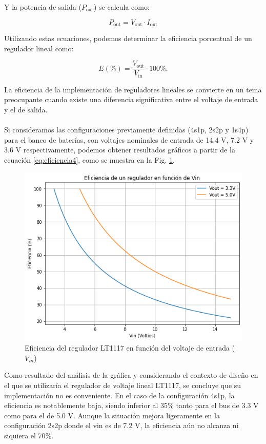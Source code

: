 Y la potencia de salida ($P_{\text{out}}$) se calcula como:

\begin{equation}
P_{\text{out}} = V_{\text{out}} \cdot I_{\text{out}}
\label{eq:eficiencia3}
\end{equation}

Utilizando estas ecuaciones, podemos determinar la eficiencia porcentual de un regulador lineal como:

\begin{equation}
E (\%) = \frac{V_{\text{out}}}{V_{\text{in}}}\cdot 100\%.
\label{eq:eficiencia4}
\end{equation}

La eficiencia de la implementación de reguladores lineales se convierte en un tema preocupante cuando existe una diferencia significativa entre el voltaje de entrada y el de salida. \\\\Si consideramos las configuraciones previamente definidas (4s1p, 2s2p y 1s4p) para el banco de baterías, con voltajes nominales de entrada de 14.4 V, 7.2 V y 3.6 V respectivamente, podemos obtener resultados gráficos a partir de la ecuación \ref{eq:eficiencia4}, como se muestra en la Fig. \ref{fig:LDO_Efficiency}.

\newpage

\begin{figure}[h]
  \centering
  \includegraphics[width=0.8\linewidth]{Pictures/Grafica_Eficiencia_LDO.png} 
  \caption{Eficiencia del regulador LT1117 en función del voltaje de entrada ($V_{in}$)}
  \label{fig:LDO_Efficiency}
\end{figure}

Como resultado del análisis de la gráfica y considerando el contexto de diseño en el que se utilizaría el regulador de voltaje lineal LT1117, se concluye que su implementación no es conveniente. En el caso de la configuración 4s1p, la eficiencia es notablemente baja, siendo inferior al 35\% tanto para el bus de 3.3 V como para el de 5.0 V. Aunque la situación mejora ligeramente en la configuración 2s2p donde el vin es de 7.2 V, la eficiencia aún no alcanza ni siquiera el 70\%.

